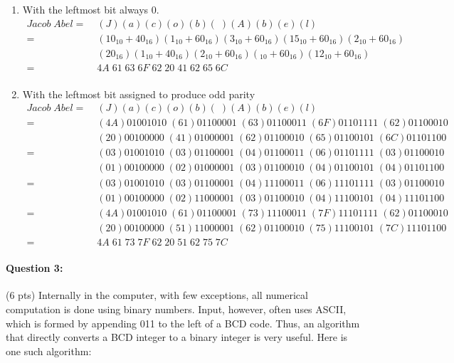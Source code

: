 \documentclass[12pt,letterpaper,notitlepage]{report}
\begin{document}
\begin{enumerate}[noitemsep, label=\alph*)]
\item With the leftmost bit always 0. 
\begin{align*}
Jacob\; Abel =\; &(J)(a)(c)(o)(b)(\;)(A)(b)(e)(l)\\ 
		     =\; &(10_{10}+40_{16})(1_{10}+60_{16})(3_{10}+60_{16})(15_{10}+60_{16})(2_{10}+60_{16})\\
		         &(20_{16})(1_{10}+40_{16})(2_{10}+60_{16})(_{10}+60_{16})(12_{10}+60_{16})\\
		     =\; &4A\;61\;63\;6F\;62\;20\;41\;62\;65\;6C\\
\end{align*}

\item With the leftmost bit assigned to produce odd parity
\begin{align*}
Jacob\; Abel =\; &(J)(a)(c)(o)(b)(\;)(A)(b)(e)(l)\\ 
	 	   =\; &(4A)01001010 \;(61)01100001\;(63)01100011\;(6F)01101111\;(62)01100010\\
	 		   &(20)00100000\;(41)01000001\;(62)01100010\;(65)01100101\;(6C)01101100\\ 
	 	   =\; &(03)01001010\;(03)01100001\;(04)01100011\;(06)01101111\;(03)01100010\\
	 		   &(01)00100000\;(02)01000001\;(03)01100010\;(04)01100101\;(04)01101100\\
	 	   =\; &(03)01001010\;(03)01100001\;(04)11100011\;(06)11101111\;(03)01100010\\
	 		   &(01)00100000\;(02)11000001\;(03)01100010\;(04)11100101\;(04)11101100\\
	 	   =\; &(4A)01001010\;(61)01100001\;(73)11100011\;(7F)11101111\;(62)01100010\\
	 		   &(20)00100000\;(51)11000001\;(62)01100010\;(75)11100101\;(7C)11101100\\
	 	   =\; &4A\;61\;73\;7F\;62\;20\;51\;62\;75\;7C
\end{align*}

\end{enumerate}

\paragraph{Question 3:}
(6 pts) Internally in the computer, with few exceptions, all numerical computation is done using binary numbers. Input, however, often uses ASCII, which is formed by appending 011 to the left of a BCD code. Thus, an algorithm that directly converts a BCD integer to a binary integer is very useful. Here is one such algorithm:\medskip
\end{document}
